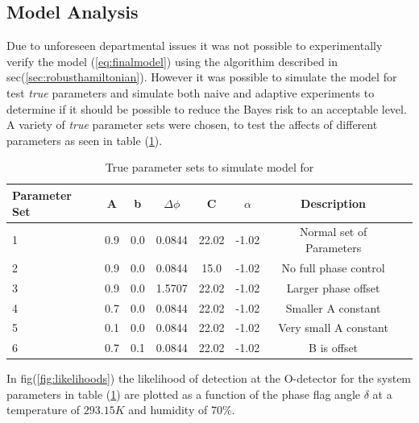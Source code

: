 \subsection{Model Analysis}
Due to unforeseen departmental issues it was not possible to experimentally verify the model (\ref{eq:finalmodel}) using the algorithim described in sec(\ref{sec:robusthamiltonian}). However it was possible to simulate the model for test \textit{true} parameters and simulate both naive and adaptive experiments to determine if it should be possible to reduce the Bayes risk to an acceptable level. A variety of \textit{true} parameter sets were chosen, to test the affects of different parameters as seen in table (\ref{tab:trueparams}). 
\begin{table}[h]
\begin{center}
\begin{tabular}{l*{6}{c}r}
Parameter Set     & A&b& $\Delta\phi$ & C & $\alpha$ & Description \\
\hline
1& 0.9& 0.0& 0.0844& 22.02& -1.02 & Normal set of Parameters  \\
2&  0.9& 0.0& 0.0844& 15.0& -1.02 & No full phase control \\
3& 0.9& 0.0& 1.5707& 22.02& -1.02 &   Larger phase offset \\
4& 0.7& 0.0& 0.0844& 22.02& -1.02 & Smaller A constant\\
5& 0.1& 0.0& 0.0844& 22.02& -1.02 & Very small A constant\\
6&  0.7& 0.1& 0.0844& 22.02& -1.02 & B is offset\\
\end{tabular}
\caption{True parameter sets to simulate model for}
\label{tab:trueparams}
\end{center}
\end{table}
In fig(\ref{fig:likelihoods}) the likelihood of detection at the O-detector for the system parameters in table (\ref{tab:trueparams}) are plotted as a function of the phase flag angle $\delta$ at a temperature of $293.15K$ and humidity of $70\%$. 

